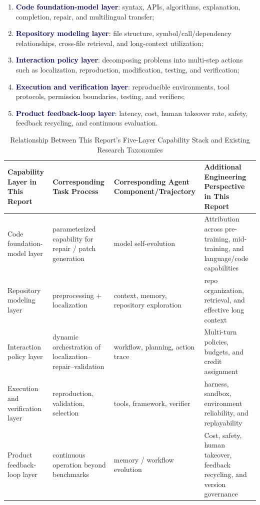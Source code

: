 \documentclass[10pt,a4paper,UTF8,fontset=none]{ctexart}
\newcommand{\stage}[1]{\textcolor{Navy}{\textbf{#1}}}
\begin{document}
\begin{enumerate}
  \item \stage{Code foundation-model layer}: syntax, APIs, algorithms, explanation, completion, repair, and multilingual transfer;
  \item \stage{Repository modeling layer}: file structure, symbol/call/dependency relationships, cross-file retrieval, and long-context utilization;
  \item \stage{Interaction policy layer}: decomposing problems into multi-step actions such as localization, reproduction, modification, testing, and verification;
  \item \stage{Execution and verification layer}: reproducible environments, tool protocols, permission boundaries, testing, and verifiers;
  \item \stage{Product feedback-loop layer}: latency, cost, human takeover rate, safety, feedback recycling, and continuous evaluation.
\end{enumerate}

\begin{table}[htbp]
\centering
\caption{Relationship Between This Report's Five-Layer Capability Stack and Existing Research Taxonomies}
\label{en:tab:taxonomy-map}
\small
\begin{tabularx}{\textwidth}{p{2.5cm}YYY}
\toprule
Capability Layer in This Report & Corresponding Task Process & Corresponding Agent Component/Trajectory & Additional Engineering Perspective in This Report \\
\midrule
Code foundation-model layer & parameterized capability for repair / patch generation & model self-evolution & Attribution across pre-training, mid-training, and language/code capabilities \\
Repository modeling layer & preprocessing + localization & context, memory, repository exploration & repo organization, retrieval, and effective long context \\
Interaction policy layer & dynamic orchestration of localization--repair--validation & workflow, planning, action trace & Multi-turn policies, budgets, and credit assignment \\
Execution and verification layer & reproduction, validation, selection & tools, framework, verifier & harness, sandbox, environment reliability, and replayability \\
Product feedback-loop layer & continuous operation beyond benchmarks & memory / workflow evolution & Cost, safety, human takeover, feedback recycling, and version governance \\
\bottomrule
\end{tabularx}
\end{table}
\end{document}
